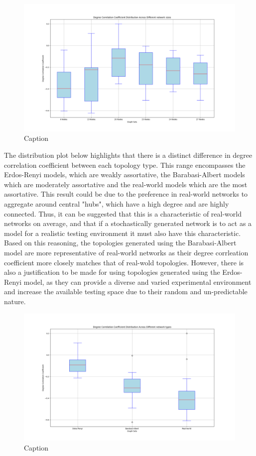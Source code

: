 \begin{figure}
    \centering
    \includegraphics[width=0.9\linewidth]{images/FINAL-TOPO-COMP/Degree-coeff-distrib/Distrib-by-size.png}
    \caption{Caption}
    \label{fig:enter-label}
\end{figure}

The distribution plot below highlights that there is a distinct difference in degree correlation coefficient between each topology type. This range encompasses the Erdos-Renyi models, which are weakly assortative, the Barabasi-Albert models which are moderately assortative and the real-world models which are the most assortative. This result could be due to the preference in real-world networks to aggregate around central "hubs", which have a high degree and are highly connected. Thus, it can be suggested that this is a characteristic of real-world networks on average, and that if a stochastically generated network is to act as a model for a realistic testing environment it must also have this characteristic. Based on this reasoning, the topologies generated using the Barabasi-Albert model are more representative of real-world networks as their degree corrleation coefficient more closely matches that of real-wold topologies. However, there is also a justification to be made for using topologies generated using the Erdos-Renyi model, as they can provide a diverse and varied experimental environment and increase the available testing space due to their random and un-predictable nature. 

\begin{figure}
    \centering
    \includegraphics[width=0.9\linewidth]{images/FINAL-TOPO-COMP/Degree-coeff-distrib/Distrib-by-type.png}
    \caption{Caption}
    \label{fig:enter-label}
\end{figure}

